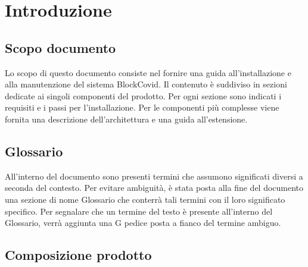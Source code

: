 \section{Introduzione}

\subsection{Scopo documento}
Lo scopo di questo documento consiste nel fornire una guida all'installazione e alla manutenzione del sistema BlockCovid. Il contenuto è suddiviso in sezioni dedicate ai singoli componenti del prodotto. Per ogni sezione sono indicati i requisiti e i passi per l'installazione. Per le componenti più complesse viene fornita una descrizione dell'architettura e una guida all'estensione.

\subsection{Glossario}
All’interno del documento sono presenti termini che assumono significati diversi a seconda del contesto. Per evitare ambiguità, è stata posta alla fine del documento una sezione di nome Glossario che conterrà tali termini con il loro significato specifico. Per segnalare che un termine del testo è presente all’interno del Glossario, verrà aggiunta una G pedice posta a fianco del termine ambiguo.
 
\subsection{Composizione prodotto}
